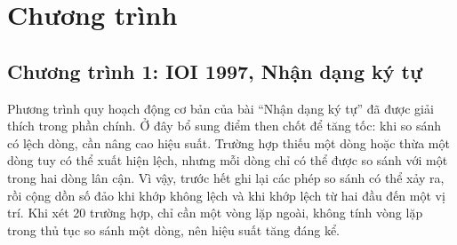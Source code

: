 \documentclass[11pt]{article}
\begin{document}
\appendix
\section{Chương trình}

\subsection{Chương trình 1: IOI 1997, Nhận dạng ký tự}

Phương trình quy hoạch động cơ bản của bài ``Nhận dạng ký tự'' đã được giải
thích trong phần chính. Ở đây bổ sung điểm then chốt để tăng tốc: khi so sánh
có lệch dòng, cần nâng cao hiệu suất. Trường hợp thiếu một dòng hoặc thừa một
dòng tuy có thể xuất hiện lệch, nhưng mỗi dòng chỉ có thể được so sánh với
một trong hai dòng lân cận. Vì vậy, trước hết ghi lại các phép so sánh có thể
xảy ra, rồi cộng dồn số đảo khi khớp không lệch và khi khớp lệch từ hai đầu
đến một vị trí. Khi xét 20 trường hợp, chỉ cần một vòng lặp ngoài, không tính
vòng lặp trong thủ tục so sánh một dòng, nên hiệu suất tăng đáng kể.
\end{document}
